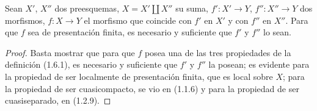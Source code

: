 \begin{proposition}[1.6.5]
\label{IV.1.6.5-fr}
Sean $X'$, $X''$ dos preesquemas, $X=X'\amalg X''$ su suma,
$f':X'\to Y$, $f'':X''\to Y$ dos morfismos, $f:X\to Y$ el morfismo que
coincide con $f'$ en $X'$ y con $f''$ en $X''$. Para que $f$ sea de
presentación finita, es necesario y suficiente que $f'$ y $f''$ lo sean.
\end{proposition}

\par\medskip\noindent
\begin{proof}
Basta mostrar que para que $f$ posea una de las tres propiedades de la
definición
(1.6.1), es necesario y suficiente que $f'$ y $f''$ la posean; es evidente
para la propiedad de ser localmente de presentación finita, que es local sobre
$X$; para la propiedad de ser cuasicompacto, se vio en (1.1.6) y para
la propiedad de ser cuasiseparado, en (1.2.9).
\end{proof}

